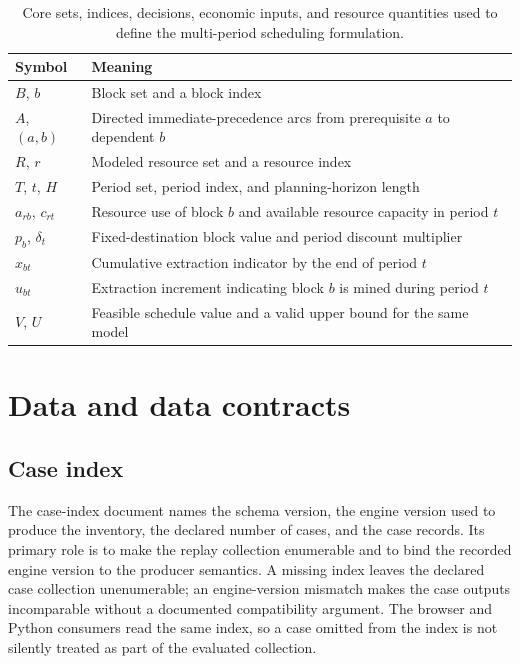 \begin{table}[htbp]
\centering
\caption{Core sets, indices, decisions, economic inputs, and resource quantities used to define the multi-period scheduling formulation.}
\label{tab:notation}
\begin{tabular}{>{\raggedright\arraybackslash}p{}>{\raggedright\arraybackslash}p{}}
\toprule
Symbol & Meaning \\
\midrule
$B$, $b$ & Block set and a block index \\
$A$, $(a,b)$ & Directed immediate-precedence arcs from prerequisite $a$ to dependent $b$ \\
$R$, $r$ & Modeled resource set and a resource index \\
$T$, $t$, $H$ & Period set, period index, and planning-horizon length \\
$a_{rb}$, $c_{rt}$ & Resource use of block $b$ and available resource capacity in period $t$ \\
$p_b$, $\delta_t$ & Fixed-destination block value and period discount multiplier \\
$x_{bt}$ & Cumulative extraction indicator by the end of period $t$ \\
$u_{bt}$ & Extraction increment indicating block $b$ is mined during period $t$ \\
$V$, $U$ & Feasible schedule value and a valid upper bound for the same model \\
\bottomrule
\end{tabular}
\end{table}

\section{Data and data contracts}
\label{sec:data-contracts}
\subsection{Case index}
\label{sec:data-case-index}
The case-index document names the schema version, the engine version used to produce the inventory, the declared number of cases, and the case records. Its primary role is to make the replay collection enumerable and to bind the recorded engine version to the producer semantics. A missing index leaves the declared case collection unenumerable; an engine-version mismatch makes the case outputs incomparable without a documented compatibility argument. The browser and Python consumers read the same index, so a case omitted from the index is not silently treated as part of the evaluated collection.

